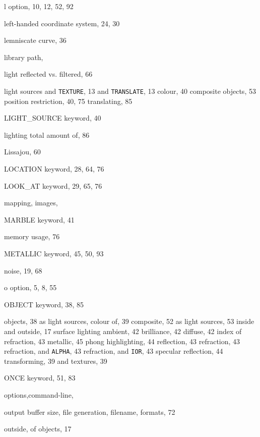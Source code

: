 \begin{theindex}
  \item {\ptt l} option, 10, 12, 52, 92
  \item left-handed coordinate system, 24, 30
  \item lemniscate curve, 36
  \item library path, 
  \item light
    \subitem reflected vs. filtered, 66
  \item light sources
    \subitem and {\tt TEXTURE}, 13
    \subitem and {\tt TRANSLATE}, 13
    \subitem colour, 40
    \subitem composite objects, 53
    \subitem position restriction, 40, 75
    \subitem translating, 85
  \item {\ptt LIGHT\_SOURCE} keyword, 40
  \item lighting
    \subitem total amount of, 86
  \item {\ptt Lissajou}, 60
  \item {\ptt LOCATION} keyword, 28, 64, 76
  \item {\ptt LOOK\_AT} keyword, 29, 65, 76

  \indexspace

  \item mapping, images, 
  \item {\ptt MARBLE} keyword, 41
  \item memory usage, 76
  \item {\ptt METALLIC} keyword, 45, 50, 93

  \indexspace

  \item noise, 19, 68

  \indexspace

  \item {\ptt o} option, 5, 8, 55
  \item {\ptt OBJECT} keyword, 38, 85
  \item objects, 38
    \subitem as light sources, 
    \subitem colour of, 39
    \subitem composite, 52
      \subsubitem as light sources, 53
    \subitem inside and outside, 17
    \subitem surface lighting
      \subsubitem ambient, 42
      \subsubitem brilliance, 42
      \subsubitem diffuse, 42
      \subsubitem index of refraction, 43
      \subsubitem metallic, 45
      \subsubitem phong highlighting, 44
      \subsubitem reflection, 43
      \subsubitem refraction, 43
      \subsubitem refraction, and {\tt ALPHA}, 43
      \subsubitem refraction, and {\tt IOR}, 43
      \subsubitem specular reflection, 44
    \subitem transforming, 39
      \subsubitem and textures, 39
  \item {\ptt ONCE} keyword, 51, 83
  \item options,command-line, 
  \item output
    \subitem buffer size, 
    \subitem file generation, 
    \subitem filename, 
    \subitem formats, 72
  \item outside, of objects, 17


\end{theindex}
